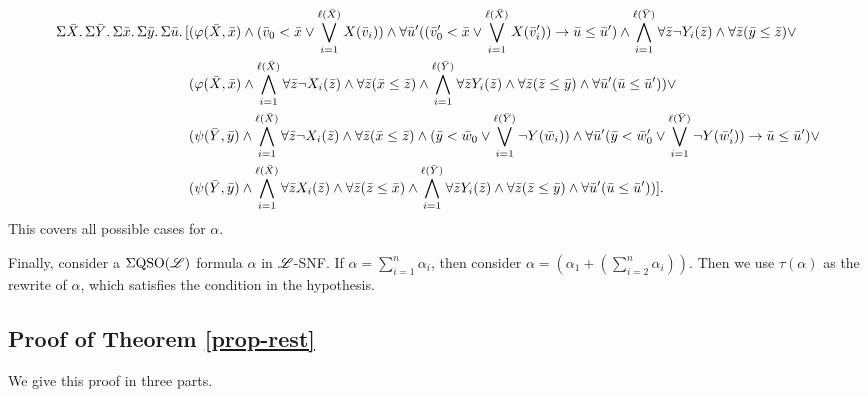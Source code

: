 \begin{align*}
\Sigma{\bar{X}}.\,\Sigma{\bar{Y}}.\,\Sigma{\bar{x}}.\,\Sigma{\bar{y}}.\,\Sigma{\bar{u}}.\,[&(\varphi(\bar{X},\bar{x})\wedge(\bar{v}_0 < \bar{x} \vee \bigvee_{i = 1}^{\ell(\bar{X})}X(\bar{v}_i))\wedge\forall\bar{u}'((\bar{v}_0' < \bar{x} \vee \bigvee_{i = 1}^{\ell(\bar{X})}X(\bar{v}_i'))\to\bar{u}\leq\bar{u}') \wedge\bigwedge_{i = 1}^{\ell(\bar{Y})} \forall\bar{z}\neg Y_i(\bar{z}) \wedge \forall\bar{z}(\bar{y}\leq\bar{z})\vee\\
&(\varphi(\bar{X},\bar{x})\wedge\bigwedge_{i = 1}^{\ell(\bar{X})} \forall\bar{z}\neg X_i(\bar{z}) \wedge \forall\bar{z}(\bar{x}\leq\bar{z})\wedge\bigwedge_{i = 1}^{\ell(\bar{Y})} \forall\bar{z} Y_i(\bar{z}) \wedge \forall\bar{z}(\bar{z}\leq\bar{y})\wedge\forall\bar{u}'(\bar{u}\leq\bar{u}'))\vee\\
&(\psi(\bar{Y},\bar{y})\wedge\bigwedge_{i = 1}^{\ell(\bar{X})} \forall\bar{z}\neg X_i(\bar{z}) \wedge \forall\bar{z}(\bar{x}\leq\bar{z})\wedge(\bar{y} < \bar{w}_0 \vee \bigvee_{i = 1}^{\ell(\bar{Y})}\neg Y(\bar{w}_i))\wedge\forall\bar{u}'(\bar{y} < \bar{w}_0' \vee \bigvee_{i = 1}^{\ell(\bar{Y})}\neg Y(\bar{w}_i'))\to\bar{u}\leq\bar{u}')\vee\\
&(\psi(\bar{Y},\bar{y})\wedge\bigwedge_{i = 1}^{\ell(\bar{X})} \forall\bar{z} X_i(\bar{z}) \wedge \forall\bar{z}(\bar{z}\leq\bar{x})\wedge\bigwedge_{i = 1}^{\ell(\bar{Y})} \forall\bar{z} Y_i(\bar{z}) \wedge \forall\bar{z}(\bar{z}\leq\bar{y})\wedge\forall\bar{u}'(\bar{u}\leq\bar{u}'))].
\end{align*}
This covers all possible cases for $\alpha$.

Finally, consider a $\Sigma{\rm QSO}(\mathscr{L})$ formula $\alpha$ in $\mathscr{L}$-SNF. If $\alpha = \sum_{i = 1}^n\alpha_i$, then consider $\alpha = (\alpha_1 + (\sum_{i = 2}^n\alpha_i))$. Then we use $\tau(\alpha)$ as the rewrite of $\alpha$, which satisfies the condition in the hypothesis.










\subsection*{Proof of Theorem \ref{prop-rest}}
We give this proof in three parts.

